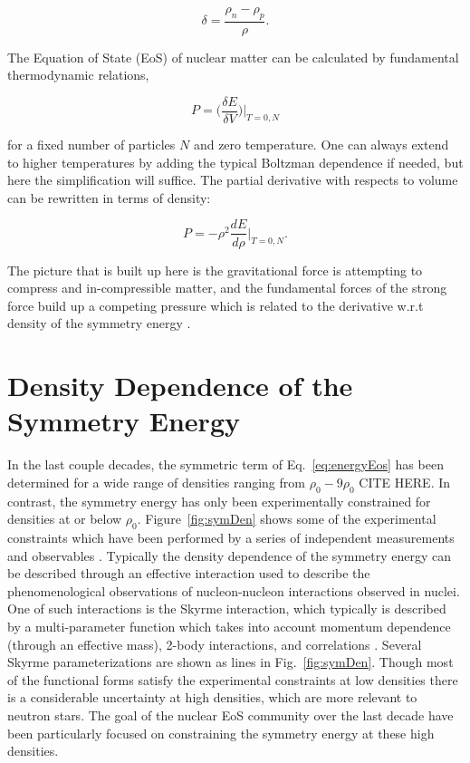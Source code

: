 \begin{equation}
\delta = \frac{\rho_n - \rho_p}{\rho}.
\label{eq:asym}
\end{equation}

The Equation of State (EoS) of nuclear matter can be calculated by fundamental thermodynamic relations, 

\begin{equation}
P = \Big(\frac{\delta E}{\delta V}\Big)\vert_{T=0,N}
\label{eq:pressEos}
\end{equation}

for a fixed number of particles $N$ and zero temperature. One can always extend to higher temperatures by adding the typical Boltzman dependence if needed, but here the simplification will suffice. The partial derivative with respects to volume can be rewritten in terms of density:

\begin{equation}
P = -\rho^2 \frac{dE}{d\rho}\vert_{T=0,N}.
\label{eq:densEos}
\end{equation}

The picture that is built up here is the gravitational force is attempting to compress and in-compressible matter, and the fundamental forces of the strong force build up a competing pressure which is related to the derivative w.r.t density of the symmetry energy \cite{tovEq}.  

\section{Density Dependence of the Symmetry Energy}
In the last couple decades, the symmetric term of Eq.~\ref{eq:energyEos} has been determined for a wide range of densities ranging from $\rho_0 - 9\rho_0$ CITE HERE. In contrast, the symmetry energy has only been experimentally constrained for densities at or below $\rho_0$. Figure~\ref{fig:symDen} shows some of the experimental constraints which have been performed by a series of independent measurements and observables \cite{awayforward}. Typically the density dependence of the symmetry energy can be described through an effective interaction used to describe the phenomenological observations of nucleon-nucleon interactions observed in nuclei. One of such interactions is the Skyrme interaction, which typically is described by a multi-parameter function which takes into account momentum dependence (through an effective mass), 2-body interactions, and correlations \cite{skyrme}. Several Skyrme parameterizations are shown as lines in Fig.~\ref{fig:symDen}. Though most of the functional forms satisfy the experimental constraints at low densities there is a considerable uncertainty at high densities, which are more relevant to neutron stars. The goal of the nuclear EoS community over the last decade have been particularly focused on constraining the symmetry energy at these high densities. 




